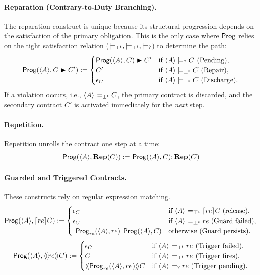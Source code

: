 \begin{definition}
\paragraph{Reparation (Contrary-to-Duty Branching).}
The reparation construct is unique because its structural progression depends on the satisfaction of the primary obligation.
This is the only case where $\Prog$ relies on the tight satisfaction relation ($\satt, \violt, \presat$) to determine the path:
\[
\Prog(\trace{A}, C \repair C') := 
\begin{cases}
  \Prog(\trace{A}, C) \repair C' & \text{if } \trace{A} \presat C \text{ (Pending)}, \\
  C' & \text{if } \trace{A} \violt C \text{ (Repair)}, \\
  \emptc & \text{if } \trace{A} \satt C \text{ (Discharge)}.
\end{cases}
\]
If a violation occurs, i.e., $\trace{A} \violt C$, the primary contract is discarded, and the secondary contract $C'$ is activated immediately for the \emph{next} step.


\paragraph{Repetition.}
Repetition unrolls the contract one step at a time:
\[
\Prog(\trace{A}, \repit{C}) := \Prog(\trace{A}, C) ; \repit{C}
\]


\paragraph{Guarded and Triggered Contracts.}
These constructs rely on regular expression matching.
\[
\Prog(\trace{A}, \guard[re]{C}) :=
\begin{cases}
  \emptc & \text{if } \trace{A} \satt \guard[re]{C} \text{ (release)}, \\
  \emptc & \text{if } \trace{A} \violt re \text{ (Guard failed)}, \\
  \guard[\Prog_{re}(\trace{A}, re)]{\Prog(\trace{A}, C)} & \text{otherwise (Guard persists)}.
\end{cases}
\]
\[
\Prog(\trace{A}, \trig[re]{C}) :=
\begin{cases}
  \emptc & \text{if } \trace{A} \violt re \text{ (Trigger failed)}, \\
  C & \text{if } \trace{A} \satt re \text{ (Trigger fires)}, \\
  \trig[\Prog_{re}(\trace{A}, re)]{C} & \text{if } \trace{A} \presat re \text{ (Trigger pending)}.
\end{cases}
\]


\end{definition}
